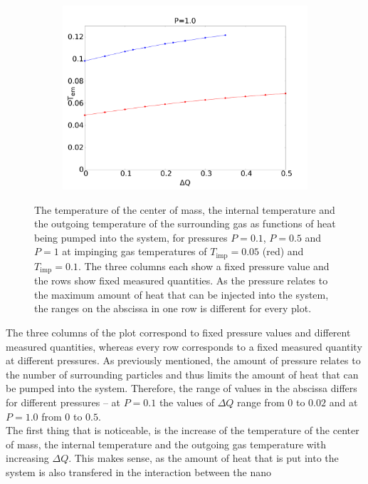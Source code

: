 \documentclass[12pt]{article}
\begin{document}
\begin{figure}[h]
\begin{center}
\begin{subfigure}[t]{0.3\textwidth}
            \includegraphics[scale=0.13]{images/p1_out.pdf}
        \end{subfigure} 
        \caption{The temperature of the center of mass, the internal temperature and the outgoing temperature of the surrounding gas as functions of
            heat being pumped into the system, for pressures
        $P=0.1$, $P=0.5$ and $P=1$ at impinging gas temperatures of $T_\text{imp}=0.05$ (red) and $T_\text{imp}=0.1$. The three columns each show 
        a fixed pressure value and the rows show fixed measured quantities. As the pressure relates to the maximum amount of heat that can be injected
    into the system, the ranges on the abscissa in one row is different for every plot.}
        \label{fig:comintout}
    \end{center}
\end{figure}
The three columns of the plot correspond to fixed pressure values and different measured quantities, whereas every row corresponds to a fixed measured
quantity at different pressures. As previously mentioned, the amount of pressure relates to the number of surrounding particles and thus limits the
amount of heat that can be pumped into the system. Therefore, the range of values in the abscissa differs for different pressures -- at $P=0.1$ the
values of $\Delta Q$ range from $0$ to $0.02$ and at $P=1.0$ from $0$ to $0.5$.\\
The first thing that is noticeable, is the increase of the temperature of the center of mass, the internal temperature and the outgoing gas temperature
with increasing $\Delta Q$. This makes sense, as the amount of heat that is put into the system is also transfered in the interaction between the nano
\end{document}
